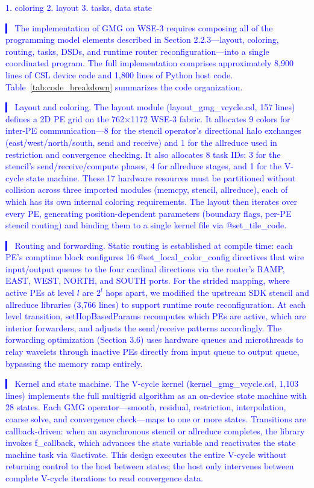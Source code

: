 \documentclass[sigconf]{acmart}
\begin{document}
\textcolor{blue}{
    1. coloring
    2. layout
    3. tasks, data state

  ▎ The implementation of GMG on WSE-3 requires composing all of the programming model elements described in Section 2.2.3—layout, coloring, routing, tasks, DSDs, and runtime router reconfiguration—into a single coordinated
  program. The full implementation comprises approximately 8,900 lines of CSL device code and 1,800 lines of Python host code. Table~\ref{tab:code_breakdown} summarizes the code organization.

  ▎ Layout and coloring. The layout module (layout_gmg_vcycle.csl, 157 lines) defines a 2D PE grid on the 762×1172 WSE-3 fabric. It allocates 9 colors for inter-PE communication—8 for the stencil operator's directional halo
  exchanges (east/west/north/south, send and receive) and 1 for the allreduce used in restriction and convergence checking. It also allocates 8 task IDs: 3 for the stencil's send/receive/compute phases, 4 for allreduce
  stages, and 1 for the V-cycle state machine. These 17 hardware resources must be partitioned without collision across three imported modules (memcpy, stencil, allreduce), each of which has its own internal coloring
  requirements. The layout then iterates over every PE, generating position-dependent parameters (boundary flags, per-PE stencil routing) and binding them to a single kernel file via @set_tile_code.

  ▎ Routing and forwarding. Static routing is established at compile time: each PE's comptime block configures 16 @set_local_color_config directives that wire input/output queues to the four cardinal directions via the
  router's RAMP, EAST, WEST, NORTH, and SOUTH ports. For the strided mapping, where active PEs at level $l$ are $2^l$ hops apart, we modified the upstream SDK stencil and allreduce libraries (3,766 lines) to support runtime
  route reconfiguration. At each level transition, setHopBasedParams recomputes which PEs are active, which are interior forwarders, and adjusts the send/receive patterns accordingly. The forwarding optimization (Section
  3.6) uses hardware queues and microthreads to relay wavelets through inactive PEs directly from input queue to output queue, bypassing the memory ramp entirely.

  ▎ Kernel and state machine. The V-cycle kernel (kernel_gmg_vcycle.csl, 1,103 lines) implements the full multigrid algorithm as an on-device state machine with 28 states. Each GMG operator—smooth, residual, restriction,
  interpolation, coarse solve, and convergence check—maps to one or more states. Transitions are callback-driven: when an asynchronous stencil or allreduce completes, the library invokes f_callback, which advances the state
  variable and reactivates the state machine task via @activate. This design executes the entire V-cycle without returning control to the host between states; the host only intervenes between complete V-cycle iterations to
  read convergence data.

}
\end{document}
